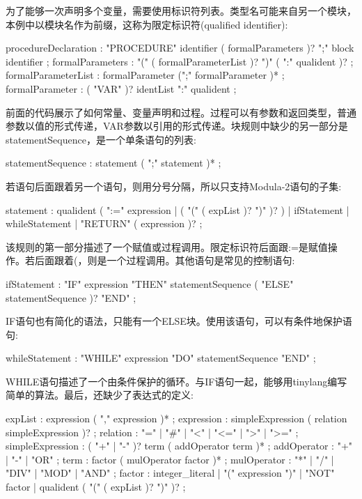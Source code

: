 为了能够一次声明多个变量，需要使用标识符列表。类型名可能来自另一个模块，本例中以模块名作为前缀，这称为限定标识符(qualified identifier):

\begin{shell}
procedureDeclaration
    : "PROCEDURE" identifier ( formalParameters )? ";"
        block identifier ;
formalParameters
    : "(" ( formalParameterList )? ")" ( ":" qualident )? ;
formalParameterList
    : formalParameter (";" formalParameter )* ;
formalParameter : ( "VAR" )? identList ":" qualident ;
\end{shell}

前面的代码展示了如何常量、变量声明和过程。过程可以有参数和返回类型，普通参数以值的形式传递，VAR参数以引用的形式传递。块规则中缺少的另一部分是statementSequence，是一个单条语句的列表:

\begin{shell}
statementSequence
    : statement ( ";" statement )* ;
\end{shell}

若语句后面跟着另一个语句，则用分号分隔，所以只支持Modula-2语句的子集:

\begin{shell}
statement
    : qualident ( ":=" expression | ( "(" ( expList )? ")" )? )
    | ifStatement | whileStatement | "RETURN" ( expression )? ;
\end{shell}

该规则的第一部分描述了一个赋值或过程调用。限定标识符后面跟:=是赋值操作。若后面跟着(，则是一个过程调用。其他语句是常见的控制语句:

\begin{shell}
ifStatement
    : "IF" expression "THEN" statementSequence
        ( "ELSE" statementSequence )? "END" ;
\end{shell}

IF语句也有简化的语法，只能有一个ELSE块。使用该语句，可以有条件地保护语句:

\begin{shell}
whileStatement
    : "WHILE" expression "DO" statementSequence "END" ;
\end{shell}

WHILE语句描述了一个由条件保护的循环。与IF语句一起，能够用tinylang编写简单的算法。最后，还缺少了表达式的定义:

\begin{shell}
expList
    : expression ( "," expression )* ;
expression
    : simpleExpression ( relation simpleExpression )? ;
relation
    : "=" | "#" | "<" | "<=" | ">" | ">=" ;
simpleExpression
    : ( "+" | "-" )? term ( addOperator term )* ;
addOperator
    : "+" | "-" | "OR" ;
term
    : factor ( mulOperator factor )* ;
mulOperator
    : "*" | "/" | "DIV" | "MOD" | "AND" ;
factor
    : integer_literal | "(" expression ")" | "NOT" factor
    | qualident ( "(" ( expList )? ")" )? ;
\end{shell}

